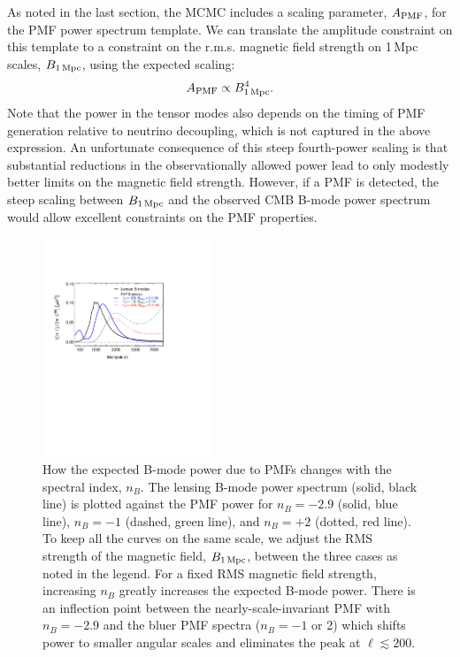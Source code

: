 \documentclass[apj]{emulateapj}
\newcommand{\apmf}{\ensuremath{A_{\rm PMF}}}
\newcommand{\bpmf}{\ensuremath{B_{\rm 1\,Mpc}}}
\newcommand{\be}{\begin{equation}}
\newcommand{\ee}{\end{equation}}
\begin{document}
As noted in the last section, the MCMC includes a  scaling parameter, \apmf{}, for the PMF power spectrum template. 
We can translate the amplitude constraint on this template to a constraint on the r.m.s. magnetic field strength on 1\,Mpc scales, \bpmf, using the expected scaling:
\be \label{eqn:scaling}
\apmf \propto \bpmf^4.
\ee
Note that the power in the tensor modes also depends on the timing of PMF generation relative to neutrino decoupling, which is not captured in the above expression. 
An unfortunate consequence of this steep fourth-power scaling is that substantial reductions in the observationally allowed power lead to only modestly better limits on the magnetic field strength. 
However, if a PMF is detected, the steep scaling between \bpmf{} and the observed CMB B-mode power spectrum would allow excellent constraints on the PMF properties.



\begin{figure}[htb]\centering
\includegraphics[width=0.45\textwidth,clip,trim={1.5cm 12.cm 5.5cm 4cm}]{pmf_templates_nb.pdf}
  \caption[CMB polarization from PMFs with different spectral indices]{ \label{fig:pmf-nb}
  How the expected B-mode power due to PMFs changes with the spectral index, $n_B$. 
  The lensing B-mode power spectrum (solid, black line) is plotted against the PMF power for $n_B=-2.9$ (solid, blue line), $n_B=-1$ (dashed, green line), and $n_B=+2$ (dotted, red line). 
  To keep all the curves on the same scale, we adjust the RMS strength of the magnetic field, \bpmf{}, between the three cases as noted in the legend. 
  For a fixed RMS magnetic field strength, increasing $n_B$ greatly increases the expected B-mode power. 
  There is an inflection point between the nearly-scale-invariant PMF with $n_B=-2.9$ and the bluer PMF spectra ($n_B=-1$ or 2) which shifts power to smaller angular scales and eliminates the peak at $\ell \lesssim 200$. 
  }
\end{figure}
 
\end{document}
